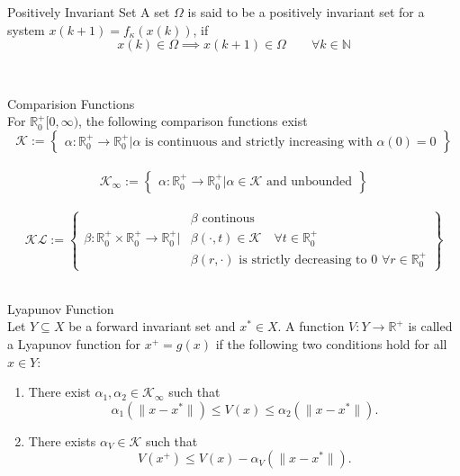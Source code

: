\begin{definition}{Positively Invariant Set}
	A set $\Omega$ is said to be a positively invariant set for a system $x(k+1) = f_\kappa (x(k))$, if
	\begin{equation*}
		x(k)\in \Omega \implies x(k+1) \in \Omega \quad \quad \forall k \in \mathbb{N}
	\end{equation*}
\end{definition}\\



\begin{definition}{Comparision Functions}\\
	For $\mathbb{R}_0^+ [0,\infty)$, the following comparison functions exist
	\begin{equation}
		\mathcal{K} := \left\{
		\begin{aligned}
			\alpha : \mathbb{R}_0^+ \rightarrow \mathbb{R}_0^+\Bigg|\alpha \text{ is continuous}\text{ and strictly increasing with }\alpha(0) = 0
		\end{aligned}
		\right\}
	\end{equation}\\
	\begin{equation}
		\mathcal{K}_\infty := \left\{
		\begin{aligned}
			\alpha : \mathbb{R}_0^+ \rightarrow \mathbb{R}_0^+\Bigg|\alpha \in \mathcal{K} \text{ and unbounded}
		\end{aligned}
		\right\}
	\end{equation}\\
	\begin{equation}
		\mathcal{K}\mathcal{L}:= \left\{
		\begin{aligned}
			&\beta \text{ continous}\\
			\beta :  \mathbb{R}_0^+\times\mathbb{R}_0^+ \rightarrow \mathbb{R}_0^+\Bigg|&\beta(\cdot, t) \in \mathcal{K} \quad \forall t \in  \mathbb{R}_0^+\\
			&\beta(r,\cdot) \text{ is strictly decreasing to 0 }\forall r\in  \mathbb{R}_0^+ 
		\end{aligned}
		\right\}
	\end{equation}\\
\end{definition}

\begin{definition}{Lyapunov Function}\\
	Let $Y \subseteq X$ be a forward invariant set and $x^* \in X$. A function $V : Y \rightarrow \mathbb{R}^+$ is called a Lyapunov function for $x^+ = g(x)$ if the following two conditions hold for all $x \in Y$:
	
	\begin{enumerate}
		\item There exist $\alpha_1, \alpha_2 \in \mathcal{K}_\infty$ such that
		\[
		\alpha_1(\|x - x^*\|) \leq V(x) \leq \alpha_2(\|x - x^*\|).
		\]
		
		\item There exists $\alpha_V \in \mathcal{K}$ such that
		\[
		V(x^+) \leq V(x) - \alpha_V(\|x - x^*\|).
		\]
	\end{enumerate}
\end{definition}



